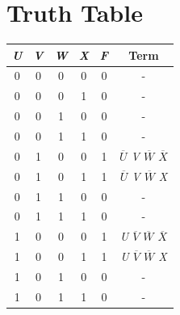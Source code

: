 \documentclass{article}
\begin{document}
\section{Truth Table}
\begin{table}[H]
\centering
\begin{tabular}{|c|c|c|c|c|c|}
\hline
\textit{\textbf{U}} & \textit{\textbf{V}} & \textit{\textbf{W}} & \textit{\textbf{X}} & \textit{\textbf{F}} & \textbf{Term}    \\ \hline
0                   & 0                   & 0                   & 0                   & 0                   & -                \\
0                   & 0                   & 0                   & 1                   & 0                   & -                \\
0                   & 0                   & 1                   & 0                   & 0                   & -                \\
0                   & 0                   & 1                   & 1                   & 0                   & -                \\
0                   & 1                   & 0                   & 0                   & 1                   & \textit{$\overline{U}$ V $\overline{W}$  $\overline{X}$} \\
0                   & 1                   & 0                   & 1                   & 1                   & \textit{$\overline{U}$ V $\overline{W}$ X}  \\
0                   & 1                   & 1                   & 0                   & 0                   & -                \\
0                   & 1                   & 1                   & 1                   & 0                   & -                \\
1                   & 0                   & 0                   & 0                   & 1                   & \textit{U $\overline{V}$ $\overline{W}$ $\overline{X}$} \\
1                   & 0                   & 0                   & 1                   & 1                   & \textit{U $\overline{V}$ $\overline{W}$ X}  \\
1                   & 0                   & 1                   & 0                   & 0                   & -                \\
1                   & 0                   & 1                   & 1                   & 0                   & -                \\

\end{tabular}
\end{table}
\end{document}
